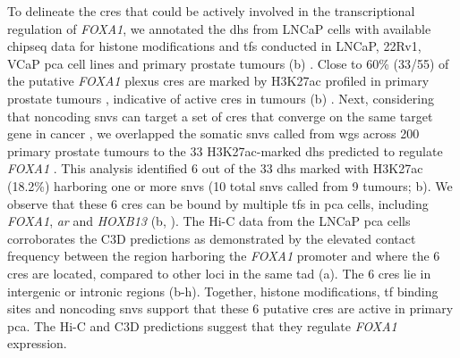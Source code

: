 To delineate the \glspl{cre} that could be actively involved in the transcriptional regulation of \emph{FOXA1}, we annotated the \gls{dhs} from LNCaP cells with available \gls{chipseq} data for histone modifications and \glspl{tf} conducted in LNCaP, 22Rv1, VCaP \gls{pca} cell lines and primary prostate tumours (b) \cite{pomerantzAndrogenReceptorCistrome2015,kronTMPRSS2ERGFusion2017}.
Close to 60\% (33/55) of the putative \emph{FOXA1} plexus \glspl{cre} are marked by H3K27ac profiled in primary prostate tumours \cite{kronTMPRSS2ERGFusion2017}, indicative of active \glspl{cre} in tumours (b) \cite{creyghtonHistoneH3K27acSeparates2010}.
Next, considering that noncoding \Glspl{snv} can target a set of \glspl{cre} that converge on the same target gene in cancer \cite{baileyNoncodingSomaticInherited2016}, we overlapped the somatic \Glspl{snv} called from \gls{wgs} across 200 primary prostate tumours to the 33 H3K27ac-marked \gls{dhs} predicted to regulate \emph{FOXA1} \cite{fraserGenomicHallmarksLocalized2017,espirituEvolutionaryLandscapeLocalized2018}.
This analysis identified 6 out of the 33 \gls{dhs} marked with H3K27ac (18.2\%) harboring one or more \glspl{snv} (10 total \glspl{snv} called from 9 tumours; b).
We observe that these 6 \glspl{cre} can be bound by multiple \glspl{tf} in \gls{pca} cells, including \emph{FOXA1}, \emph{\gls{ar}} and \emph{HOXB13} (b, ).
The Hi-C data from the LNCaP \gls{pca} cells corroborates the C3D predictions as demonstrated by the elevated contact frequency between the region harboring the \emph{FOXA1} promoter and where the 6 \glspl{cre} are located, compared to other loci in the same \gls{tad} (a).
The 6 \glspl{cre} lie in intergenic or intronic regions (b-h).
Together, histone modifications, \gls{tf} binding sites and noncoding \glspl{snv} support that these 6 putative \glspl{cre} are active in primary \gls{pca}.
The Hi-C and C3D predictions suggest that they regulate \emph{FOXA1} expression.


